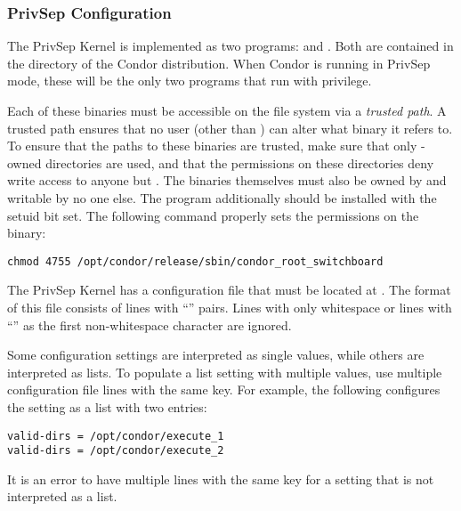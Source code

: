 \subsubsection{PrivSep Configuration}

The PrivSep Kernel is implemented as two programs:
 and . Both are contained in
the  directory of the Condor distribution. When Condor is
running in PrivSep mode, these will be the only two programs that run
with  privilege.

Each of these binaries must be accessible on the file system via a
\emph{trusted path}. A trusted path ensures that no user (other than
) can alter what binary it refers to. To ensure that the
paths to these binaries are trusted, make sure that only
-owned directories are used, and that the permissions on
these directories deny write access to anyone but . The
binaries themselves must also be owned by  and writable by
no one else. The  program additionally
should be installed with the setuid bit set. The following command
properly sets the permissions on the 
binary:
\begin{verbatim}
chmod 4755 /opt/condor/release/sbin/condor_root_switchboard
\end{verbatim}

The PrivSep Kernel has a configuration file that must be located at
. The format of this file consists
of lines with ``'' pairs. Lines with only whitespace
or lines with ``\Code{\#}'' as the first non-whitespace character are
ignored.

Some configuration settings are interpreted as single values, while
others are interpreted as lists. To populate a list setting with
multiple values, use multiple configuration file lines with the same
key. For example, the following configures the 
setting as a list with two entries:
\begin{verbatim}
valid-dirs = /opt/condor/execute_1
valid-dirs = /opt/condor/execute_2
\end{verbatim}
It is an error to have multiple lines with the same key for a setting
that is not interpreted as a list.

